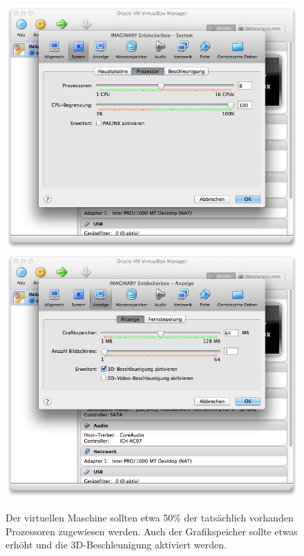 \documentclass[a4paper,10pt,BCOR=0mm,DIV=14]{scrartcl}
\def\gfxscale{0.27}
\begin{document}
\begin{figure}[h]
\centering
\includegraphics[scale=\gfxscale]{VBox60_de_DE}
\qquad
\includegraphics[scale=\gfxscale]{VBox61_de_DE}
\caption{Der virtuellen Maschine sollten etwa 50\% der tatsächlich vorhanden Prozessoren zugewiesen werden. Auch der Grafikspeicher sollte etwas erhöht und die 3D-Beschleunigung aktiviert werden.}
\label{VBox60}
\end{figure}
\end{document}
